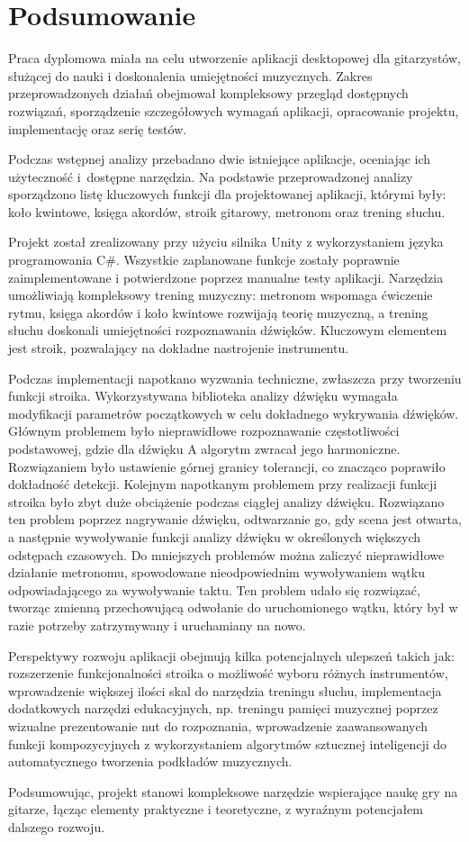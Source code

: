 \chapter{Podsumowanie}

Praca dyplomowa miała na celu utworzenie aplikacji desktopowej dla gitarzystów, służącej do nauki i doskonalenia umiejętności muzycznych. Zakres przeprowadzonych działań obejmował kompleksowy przegląd dostępnych rozwiązań, sporządzenie szczegółowych wymagań aplikacji, opracowanie projektu, implementację oraz serię testów.

Podczas wstępnej analizy przebadano dwie istniejące aplikacje, oceniając ich użyteczność i~dostępne narzędzia. Na podstawie przeprowadzonej analizy sporządzono listę kluczowych funkcji dla projektowanej aplikacji, którymi były: koło kwintowe, księga akordów, stroik gitarowy, metronom oraz trening słuchu.

Projekt został zrealizowany przy użyciu silnika Unity z wykorzystaniem języka programowania C\#. Wszystkie zaplanowane funkcje zostały poprawnie zaimplementowane i potwierdzone poprzez manualne testy aplikacji. Narzędzia umożliwiają kompleksowy trening muzyczny: metronom wspomaga ćwiczenie rytmu, księga akordów i koło kwintowe rozwijają teorię muzyczną, a trening słuchu doskonali umiejętności rozpoznawania dźwięków. Kluczowym elementem jest stroik, pozwalający na dokładne nastrojenie instrumentu.

Podczas implementacji napotkano wyzwania techniczne, zwłaszcza przy tworzeniu funkcji stroika. Wykorzystywana biblioteka analizy dźwięku wymagała modyfikacji parametrów początkowych w celu dokładnego wykrywania dźwięków. Głównym problemem było nieprawidłowe rozpoznawanie częstotliwości podstawowej, gdzie dla dźwięku A algorytm zwracał jego harmoniczne. Rozwiązaniem było ustawienie górnej granicy tolerancji, co znacząco poprawiło dokładność detekcji. Kolejnym napotkanym problemem przy realizacji funkcji stroika było zbyt duże obciążenie podczas ciągłej analizy dźwięku. Rozwiązano ten problem poprzez nagrywanie dźwięku, odtwarzanie go, gdy scena jest otwarta, a następnie wywoływanie funkcji analizy dźwięku w określonych większych odstępach czasowych. Do mniejszych problemów można zaliczyć nieprawidłowe działanie metronomu, spowodowane nieodpowiednim wywoływaniem wątku odpowiadającego za wywoływanie taktu. Ten problem udało się rozwiązać, tworząc zmienną przechowującą odwołanie do uruchomionego wątku, który był w razie potrzeby zatrzymywany i uruchamiany na nowo.

Perspektywy rozwoju aplikacji obejmują kilka potencjalnych ulepszeń takich jak: rozszerzenie funkcjonalności stroika o możliwość wyboru różnych instrumentów, wprowadzenie większej ilości skal do narzędzia treningu słuchu, implementacja dodatkowych narzędzi edukacyjnych, np. treningu pamięci muzycznej poprzez wizualne prezentowanie nut do rozpoznania, wprowadzenie zaawansowanych funkcji kompozycyjnych z wykorzystaniem algorytmów sztucznej inteligencji do automatycznego tworzenia podkładów muzycznych.

Podsumowując, projekt stanowi kompleksowe narzędzie wspierające naukę gry na gitarze, łącząc elementy praktyczne i teoretyczne, z wyraźnym potencjałem dalszego rozwoju.
